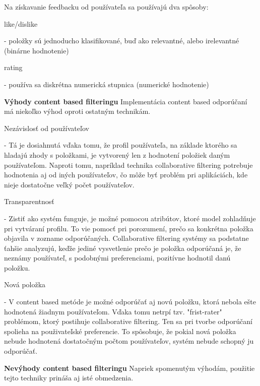 Na získavanie feedbacku od používateľa sa používajú dva spôsoby: 
\begin{itemize}[leftmargin=*]
	{\bf \item like/dislike} - položky sú jednoducho klasifikované, buď ako relevantné, alebo irelevantné (binárne hodnotenie)  
	{\bf \item rating} - používa sa diskrétna numerická stupnica (numerické hodnotenie) \\
\end{itemize}

{\bf \large Výhody content based filteringu} \newline
	Implementácia content based odporúčaní má niekoľko výhod oproti ostatným technikám. 

\begin{itemize}[leftmargin=*]
	{\bf \item Nezávislosť od používateľov} - Tá je dosiahnutá vďaka tomu, že profil používateľa, na základe ktorého sa hladajú zhody s položkami, je vytvorený len z hodnotení položiek daným používateľom. Naproti tomu, napríklad technika collaborative filtering potrebuje hodnotenia aj od iných používateľov, čo môže byť problém pri aplikáciách, kde nieje dostatočne veľký počet používateľov.
	{\bf \item Transparentnosť} - Zistiť ako systém funguje, je možné pomocou atribútov, ktoré model zohladňuje pri vytváraní profilu. To vie pomocť pri porozumení, prečo sa konkrétna položka objavila v zozname odporúčaných. Collaborative filtering systémy sa podstatne ťahšie analyzujú, keďže jediné vysvetlenie prečo je položka odporúčaná je, že neznámy používateľ, s podobnými preferenciami, pozitívne hodnotil danú položku.
	{\bf \item Nová položka} - V content based metóde je možné odporúčať aj novú položku, ktorá nebola ešte hodnotená žiadnym používateľom. Vďaka tomu netrpí tzv. "frist-rater" problémom, ktorý postihuje collaborative filtering. Ten sa pri tvorbe odporúčaní spolieha na použivateľské preferencie. To spôsobuje, že pokial nová položka nebude hodnotená dostatočným počtom používateľov, systém nebude schopný ju odporúčať. \\
\end{itemize}


{\bf \large Nevýhody content based filteringu} \newline
	Napriek spomenutým výhodám, použitie tejto techniky prináša aj isté obmedzenia. 

